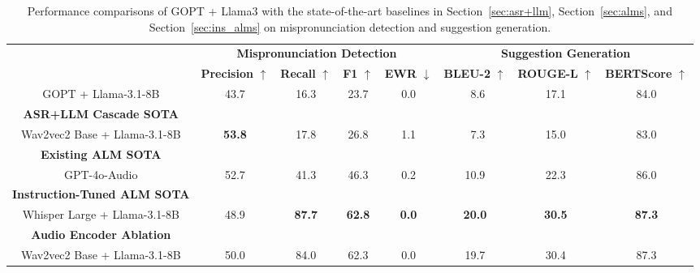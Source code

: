 \begin{table}[t]
\centering

\setlength{\tabcolsep}{3pt}
\small
\begin{tabular}{llccccccc} 
\toprule[1pt]
\multirow{2}{*}{} & \multirow{2}{*}{}& \multicolumn{4}{c}{\textbf{Mispronunciation Detection}} & \multicolumn{3}{c}{\textbf{Suggestion Generation}} \\ 
\cmidrule(lr){3-6} \cmidrule(lr){7-9}
 & & \textbf{Precision} $\uparrow$ & \textbf{Recall} $\uparrow$ & \textbf{F1} $\uparrow$ & \textbf{EWR} $\downarrow$ & \textbf{BLEU-2} $\uparrow$ & \textbf{ROUGE-L} $\uparrow$ & \textbf{BERTScore} $\uparrow$ \\ 
\midrule[0.5pt]
\multicolumn{2}{c}{GOPT + Llama-3.1-8B} & 43.7 & 16.3 & 23.7 & 0.0 & \,\,\,8.6 & 17.1 & 84.0 \\
\midrule[0.5pt]
\multicolumn{2}{c}{\textbf{ASR+LLM Cascade SOTA}} \\
\midrule[0.5pt]
\multicolumn{2}{c}{Wav2vec2 Base + Llama-3.1-8B}       & \textbf{53.8} & 17.8 & 26.8 & 1.1 & \,\,\,7.3  & 15.0 & 83.0 \\
\midrule[0.5pt]
\multicolumn{2}{c}{\textbf{Existing ALM SOTA}} \\
\midrule[0.5pt]
\multicolumn{2}{c}{GPT-4o-Audio}  & 52.7 & 41.3 & 46.3 & 0.2 & 10.9 & 22.3 & 86.0 \\
\midrule[0.5pt]
\multicolumn{2}{c}{\textbf{Instruction-Tuned ALM SOTA}} \\
\midrule[0.5pt]
\multicolumn{2}{c}{Whisper Large + Llama-3.1-8B} & 48.9 & \textbf{87.7} & \textbf{62.8} & \textbf{0.0}   & \textbf{20.0} & \textbf{30.5} & \textbf{87.3} \\
\midrule[0.5pt]
\multicolumn{2}{c}{\textbf{Audio Encoder Ablation}} \\
\midrule[0.5pt]
\multicolumn{2}{c}{Wav2vec2 Base + Llama-3.1-8B} & 50.0 & 84.0 & 62.3 & 0.0 & 19.7 & 30.4 & 87.3 \\
\bottomrule[1pt]
\end{tabular}
\caption{Performance comparisons of GOPT + Llama3 with the state-of-the-art baselines in Section~\ref{sec:asr+llm}, Section~\ref{sec:alms}, and Section~\ref{sec:ins_alms} on mispronunciation detection and suggestion generation.}

\label{tab:app_comp_1}

\end{table}